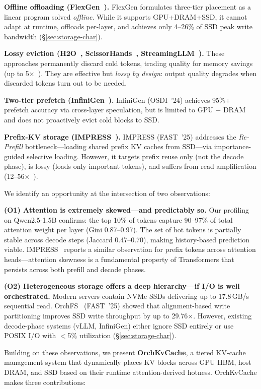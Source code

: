 \documentclass[conference]{IEEEtran}
\begin{document}
\textbf{Offline offloading (FlexGen~\cite{flexgen}).} FlexGen formulates three-tier placement as a linear program solved \emph{offline}. While it supports GPU+DRAM+SSD, it cannot adapt at runtime, offloads per-layer, and achieves only 4--26\% of SSD peak write bandwidth (\S\ref{sec:storage-char}).

\textbf{Lossy eviction (H2O~\cite{h2o}, ScissorHands~\cite{scissorhands}, StreamingLLM~\cite{streamingllm}).} These approaches permanently discard cold tokens, trading quality for memory savings (up to 5$\times$~\cite{h2o}).  They are effective but \emph{lossy by design}: output quality degrades when discarded tokens turn out to be needed.

\textbf{Two-tier prefetch (InfiniGen~\cite{infinigen}).} InfiniGen (OSDI~'24) achieves 95\%+ prefetch accuracy via cross-layer speculation, but is limited to GPU + DRAM and does not proactively evict cold blocks to SSD.

\textbf{Prefix-KV storage (IMPRESS~\cite{impress}).} IMPRESS (FAST~'25) addresses the \emph{Re-Prefill} bottleneck---loading shared prefix KV caches from SSD---via importance-guided selective loading. However, it targets prefix reuse only (not the decode phase), is lossy (loads only important tokens), and suffers from read amplification (12--56$\times$~\cite{impress}).

We identify an opportunity at the intersection of two observations:

\textbf{(O1) Attention is extremely skewed---and predictably so.} Our profiling on Qwen2.5-1.5B confirms: the top 10\% of tokens capture 90--97\% of total attention weight per layer (Gini 0.87--0.97). The set of hot tokens is partially stable across decode steps (Jaccard 0.47--0.70), making history-based prediction viable. IMPRESS~\cite{impress} reports a similar observation for prefix tokens across attention heads---attention skewness is a fundamental property of Transformers that persists across both prefill and decode phases.

\textbf{(O2) Heterogeneous storage offers a deep hierarchy---if I/O is well orchestrated.} Modern servers contain NVMe SSDs delivering up to 17.8\,GB/s sequential read. OrchFS~\cite{orchfs} (FAST~'25) showed that alignment-based write partitioning improves SSD write throughput by up to 29.76$\times$. However, existing decode-phase systems (vLLM, InfiniGen) either ignore SSD entirely or use POSIX I/O with $<$5\% utilization (\S\ref{sec:storage-char}).

Building on these observations, we present \textbf{OrchKvCache}, a tiered KV-cache management system that dynamically places KV blocks across GPU HBM, host DRAM, and SSD based on their runtime attention-derived hotness. OrchKvCache makes three contributions:
\end{document}
